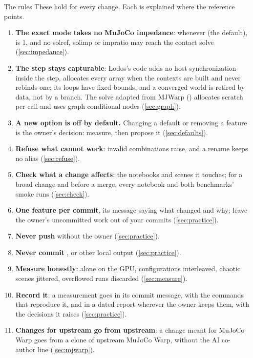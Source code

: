 \begin{notebox}{The rules}
These hold for every change. Each is explained where the reference points.
\begin{enumerate}
\item \textbf{The exact mode takes no MuJoCo impedance}: whenever  (the default),  is 1, and no solref, solimp or impratio may reach the contact solve (\cref{sec:impedance}).
\item \textbf{The step stays capturable}: Lodos's code adds no host synchronization inside the step, allocates every array when the contexts are built and never rebinds one; its loops have fixed bounds, and a converged world is retired by data, not by a branch. The solve adapted from MJWarp () allocates scratch per call and uses graph conditional nodes (\cref{sec:graph}).
\item \textbf{A new option is off by default.} Changing a default or removing a feature is the owner's decision: measure, then propose it (\cref{sec:defaults}).
\item \textbf{Refuse what cannot work}: invalid combinations raise, and a rename keeps no alias (\cref{sec:refuse}).
\item \textbf{Check what a change affects}: the notebooks and scenes it touches; for a broad change and before a merge, every notebook and both benchmarks' smoke runs (\cref{sec:check}).
\item \textbf{One feature per commit}, its message saying what changed and why; leave the owner's uncommitted work out of your commits (\cref{sec:practice}).
\item \textbf{Never push} without the owner (\cref{sec:practice}).
\item \textbf{Never commit} ,  or other local output (\cref{sec:practice}).
\item \textbf{Measure honestly}: alone on the GPU, configurations interleaved, chaotic scenes jittered, overflowed runs discarded (\cref{sec:measure}).
\item \textbf{Record it}: a measurement goes in its commit message, with the commands that reproduce it, and in a dated report wherever the owner keeps them, with the decisions it raises (\cref{sec:practice}).
\item \textbf{Changes for upstream go from upstream}: a change meant for MuJoCo Warp goes from a clone of upstream MuJoCo Warp, without the AI co-author line (\cref{sec:mjwarp}).
\end{enumerate}
\end{notebox}

